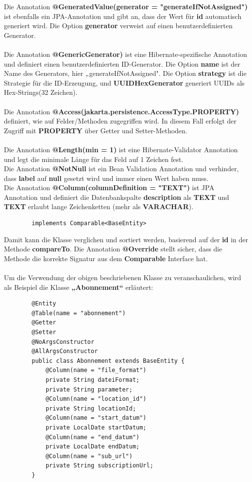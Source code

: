 \documentclass[a4paper,12pt]{scrreprt}
\begin{document}
	Die Annotation \textbf{@GeneratedValue(generator = "generateIfNotAssigned")} ist ebenfalls ein JPA-Annotation und gibt an, dass der Wert für \textbf{id} automatisch generiert wird. Die Option \textbf{generator} verweist auf einen benutzerdefinierten Generator.\\ \\
	Die Annotation \textbf{@GenericGenerator)} ist eine Hibernate-spezifische Annotation und definiert einen benutzerdefinierten ID-Generator. Die Option \textbf{name} ist der Name des Generators, hier „generateIfNotAssigned". Die Option \textbf{strategy} ist die Strategie für die ID-Erzeugung, und \textbf{UUIDHexGenerator} generiert UUIDs als Hex-Strings(32 Zeichen).\\ \\
	Die Annotation \textbf{@Access(jakarta.persistence.AccessType.PROPERTY)} definiert, wie auf Felder/Methoden zugegriffen wird. In diesem Fall erfolgt der Zugriff mit \textbf{PROPERTY} über Getter und Setter-Methoden. \\ \\
	Die Annotation \textbf{@Length(min = 1)} ist eine Hibernate-Validator Annotation und legt die minimale Länge für das Feld auf 1 Zeichen fest.\\
	Die Annotation \textbf{@NotNull} ist ein Bean Validation Annotation und verhinder, dass \textbf{label} auf \textbf{null} gesetzt wird und immer einen Wert haben muss.\\
	Die Annotation \textbf{@Column(columnDefinition = "TEXT")} ist JPA Annotation und definiert die Datenbankspalte \textbf{description} als \textbf{TEXT} und \textbf{TEXT} erlaubt lange Zeichenketten (mehr als \textbf{VARACHAR}). 
	\begin{lstlisting}
		implements Comparable<BaseEntity>
	\end{lstlisting} Damit kann die Klasse verglichen und sortiert werden, basierend auf der \textbf{id}  in der Methode \textbf{compareTo}.
	Die Annotation \textbf{@Override} stellt sicher, dass die Methode die korrekte Signatur aus dem \textbf{Comparable} Interface hat. \\ \\
	Um die Verwendung der obigen beschriebenen Klasse zu veranschaulichen, wird als Beispiel die Klasse \textbf{„Abonnement“}  erläutert:
	\begin{lstlisting}
		@Entity
		@Table(name = "abonnement")
		@Getter
		@Setter
		@NoArgsConstructor
		@AllArgsConstructor
		public class Abonnement extends BaseEntity {
			@Column(name = "file_format")
			private String dateiFormat;
			private String parameter;
			@Column(name = "location_id")
			private String locationId;
			@Column(name = "start_datum")
			private LocalDate startDatum;
			@Column(name = "end_datum")
			private LocalDate endDatum;
			@Column(name = "sub_url")
			private String subscriptionUrl;
		}
	\end{lstlisting}
\end{document}

